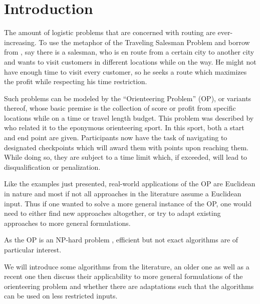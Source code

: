 \section{Introduction}
\label{sec:01:introduction}

The amount of logistic problems that are concerned with routing are ever-increasing.
To use the metaphor of the Traveling Salesman Problem and borrow from \citeauthor{chao_fast_1996} \cite{chao_fast_1996},
say there is a salesman, who is en route from a certain city to another city and wants to visit customers in different locations while on the way.
He might not have enough time to visit every customer, so he seeks a route which maximizes the profit while respecting his time restriction.

Such problems can be modeled by the \enquote{Orienteering Problem} (OP), or variants thereof,
whose basic premise is the collection of score or profit from specific locations while on a time or travel length budget. 
This problem was described by \citeauthor{tsiligiridis_heuristic_1984} \cite{tsiligiridis_heuristic_1984} who related it to the eponymous orienteering sport.
In this sport, both a start and end point are given. Participants now have the task of navigating to designated checkpoints which will award them with points upon reaching them.
While doing so, they are subject to a time limit which, if exceeded, will lead to disqualification or penalization.

Like the examples just presented, real-world applications of the OP are Euclidean in nature and
most if not all approaches in the literature assume a Euclidean input. \cite{vansteenwegen_orienteering_2011}
Thus if one wanted to solve a more general instance of the OP, one would need to either find new approaches altogether,
or try to adapt existing approaches to more general formulations. 

As the OP is an NP-hard problem \cite{golden_orienteering_1987}, efficient but not exact algorithms are of particular interest.

We will introduce some algorithms from the literature, an older one as well as a recent one 
then discuss their applicability to more general formulations of the orienteering problem
and whether there are adaptations such that the algorithms can be used on less restricted inputs.
